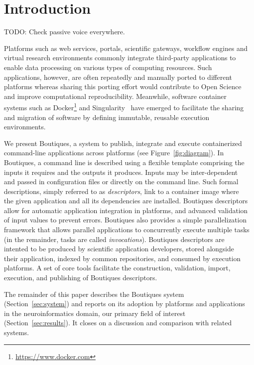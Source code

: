 \documentclass[a4paper,num-refs]{oup-contemporary}
\newcommand{\todo}[1]{\color{red}TODO: #1\color{black}}
\newcommand{\boutiques}{Boutiques\xspace}
\begin{document}
\section{Introduction}

\todo{Check passive voice everywhere.}

Platforms such as web services, portals, scientific gateways, workflow
engines and virtual research environments commonly integrate
third-party applications to enable data processing on various types of
computing resources. Such applications, however, are often repeatedly
and manually ported to different platforms whereas sharing this
porting effort would contribute to Open Science and improve
computational reproducibility. Meanwhile, software container systems
such as Docker\footnote{\url{https://www.docker.com}} and
Singularity~\cite{kurtzer2017singularity} have emerged to facilitate
the sharing and migration of software by defining immutable, reusable
execution environments.

We present \boutiques, a system to publish, integrate and execute
containerized command-line applications across platforms (see
Figure~\ref{fig:diagram}).  In \boutiques, a command line is described
using a flexible template comprising the inputs it requires and the
outputs it produces. Inputs may be inter-dependent and passed in
configuration files or directly on the command line. Such formal
descriptions, simply referred to as \emph{descriptors}, link to a
container image where the given application and all its dependencies
are installed. \boutiques descriptors allow for automatic application
integration in platforms, and advanced validation of input values to
prevent errors. \boutiques also provides a simple parallelization
framework that allows parallel applications to concurrently execute
multiple tasks (in the remainder, tasks are called
\emph{invocations}). \boutiques descriptors are intented to be
produced by scientific application developers, stored alongside their
application, indexed by common repositories, and consumed by execution
platforms.  A set of core tools facilitate the construction,
validation, import, execution, and publishing of \boutiques
descriptors.

The remainder of this paper describes the \boutiques system
(Section~\ref{sec:system}) and reports on its adoption by platforms
and applications in the neuroinformatics domain, our primary field of
interest (Section~\ref{sec:results}). It closes on a discussion and
comparison with related systems.
\end{document}
